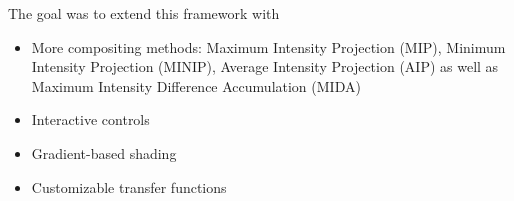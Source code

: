 \documentclass[english, paper=a4]{scrartcl}
\begin{document}
The goal was to extend this framework with
\begin{itemize}
\item More compositing methods: Maximum Intensity Projection (MIP), Minimum Intensity Projection (MINIP), Average Intensity Projection (AIP) as well as Maximum Intensity Difference Accumulation (MIDA)
\item Interactive controls
\item Gradient-based shading
\item Customizable transfer functions
\end{itemize}



\clearpage



\end{document}

